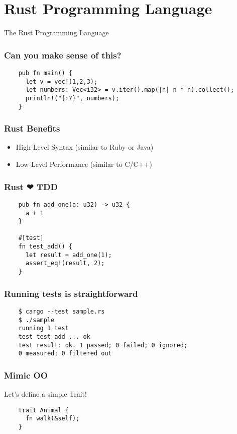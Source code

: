 \section{Rust Programming Language}
\label{sec:rust-language}

\begin{frame}
  \centerline{
    \huge{The Rust Programming Language}
  }
\end{frame}

\begin{frame}[fragile]
  \frametitle{Can you make sense of this?}
  \begin{verbatim}
    pub fn main() {
      let v = vec!(1,2,3);
      let numbers: Vec<i32> = v.iter().map(|n| n * n).collect();
      println!("{:?}", numbers);
    }
  \end{verbatim}
\end{frame}

\begin{frame}
  \frametitle{Rust Benefits}
  \begin{itemize}
  \item High-Level Syntax (similar to Ruby or Java)
  \item Low-Level Performance (similar to C/C++)
  \end{itemize}
\end{frame}

\begin{frame}[fragile]
  \frametitle{Rust ❤ TDD}
  \begin{verbatim}
    pub fn add_one(a: u32) -> u32 {
      a + 1
    }

    #[test]
    fn test_add() {
      let result = add_one(1);
      assert_eq!(result, 2);
    }
  \end{verbatim}
\end{frame}

\begin{frame}[fragile]
  \frametitle{Running tests is straightforward}
  \begin{verbatim}
    $ cargo --test sample.rs
    $ ./sample
    running 1 test
    test test_add ... ok
    test result: ok. 1 passed; 0 failed; 0 ignored;
    0 measured; 0 filtered out
  \end{verbatim}
\end{frame}

\begin{frame}[fragile]
  \frametitle{Mimic OO}
  Let's define a simple Trait! \break{}
  \begin{verbatim}
    trait Animal {
      fn walk(&self);
    }
  \end{verbatim}
\end{frame}

